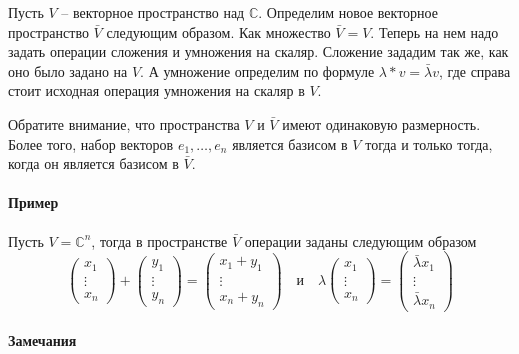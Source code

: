 \begin{definition}
Пусть $V$ -- векторное пространство над $\mathbb C$.
Определим новое векторное пространство $\bar V$ следующим образом.
Как множество $\bar V = V$.
Теперь на нем надо задать операции сложения и умножения на скаляр.
Сложение зададим так же, как оно было задано на $V$.
А умножение определим по формуле $\lambda *v = \bar \lambda v$, где справа стоит исходная операция умножения на скаляр в $V$.
\end{definition}

Обратите внимание, что пространства $V$ и $\bar V$ имеют одинаковую размерность.
Более того, набор векторов $e_1,\ldots,e_n$ является базисом в $V$ тогда и только тогда, когда он является базисом в $\bar V$.

\paragraph{Пример}

Пусть $V = \mathbb C^n$, тогда в пространстве $\bar V$ операции заданы следующим образом
\[
\begin{pmatrix}
{x_1}\\{\vdots}\\{x_n}
\end{pmatrix}
+
\begin{pmatrix}
{y_1}\\{\vdots}\\{y_n}
\end{pmatrix}
=
\begin{pmatrix}
{x_1 + y_1}\\{\vdots}\\{x_n + y_n}
\end{pmatrix}
\quad\text{и}\quad
\lambda
\begin{pmatrix}
{x_1}\\{\vdots}\\{x_n}
\end{pmatrix}
=
\begin{pmatrix}
{\bar \lambda x_1}\\{\vdots}\\{\bar \lambda x_n}
\end{pmatrix}
\]

\paragraph{Замечания}

